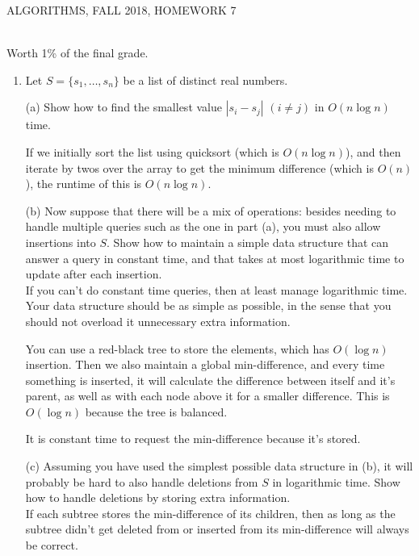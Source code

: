 \documentclass[12pt]{article}
\begin{document}
  
\pagestyle{empty}
 

\begin{center} ALGORITHMS,   FALL 2018, HOMEWORK 7
\end{center}
\\ 

\noindent Worth 1\% of the final grade.\\

\begin{enumerate}

 \item 
Let  $S = \{s_1, \ldots, s_n\}$ be a list of distinct real numbers. 


(a) Show how to find the smallest value $|s_i-s_j|$ $(i\neq j)$ in  $O(n\log n)$ time.   

If we initially sort the list using quicksort (which is $O(n\log n)$), and then iterate by twos over the array to get the minimum difference (which is $O(n)$),
the runtime of this is $O(n\log n)$.

(b) Now suppose that there will be a mix of operations: besides  needing to handle multiple queries such  as the one in part (a), you must also allow insertions into $S$.  
  Show how to maintain a simple data structure that can answer a query in constant time, and that takes at most logarithmic time to update after each insertion.  \\
  If you can't do constant time queries, then at least manage logarithmic time.  Your data structure should be as simple as possible, in the sense that you should not overload it unnecessary extra information.
    

You can use a red-black tree to store the elements, which has $O(\log n)$ insertion. Then we also maintain a global min-difference, and every time something is inserted,
it will calculate the difference between itself and it's parent, as well as with each node above it for a smaller difference. This is $O(\log n)$ because
the tree is balanced.

It is constant time to request the min-difference because it's stored.


(c) Assuming you have used the simplest possible data structure in (b), it will probably be hard to also handle deletions from $S$ in logarithmic time.
Show how to handle deletions by storing extra information. \\

If each subtree stores the min-difference of its children, then as long as the subtree didn't get deleted from or inserted from its min-difference will always be correct.


\end{enumerate}
\end{document}
